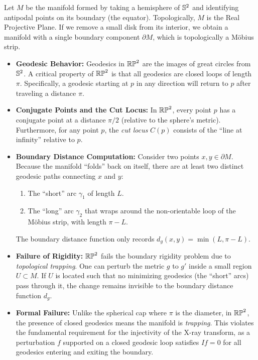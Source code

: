 \begin{example}
  Let $M$ be the manifold formed by taking a hemisphere of $\S^2$ and identifying antipodal points on its boundary (the equator). Topologically, $M$ is the Real Projective Plane. If we remove a small disk from its interior, we obtain a manifold with a single boundary component $\partial M$, which is topologically a M\"obius strip.

  \begin{itemize}
    \item \textbf{Geodesic Behavior:} Geodesics in $\RP^2$ are the images of great circles from $\S^2$. A critical property of $\RP^2$ is that all geodesics are closed loops of length $\pi$. Specifically, a geodesic starting at $p$ in any direction will return to $p$ after traveling a distance $\pi$.

    \item \textbf{Conjugate Points and the Cut Locus:} In $\RP^2$, every point $p$ has a conjugate point at a distance $\pi/2$ (relative to the sphere's metric). Furthermore, for any point $p$, the \emph{cut locus} $C(p)$ consists of the ``line at infinity'' relative to $p$. 

    \item \textbf{Boundary Distance Computation:} Consider two points $x, y \in \partial M$. Because the manifold ``folds'' back on itself, there are at least two distinct geodesic paths connecting $x$ and $y$:
      \begin{enumerate}
        \item The ``short'' arc $\gamma_1$ of length $L$.
        \item The ``long'' arc $\gamma_2$ that wraps around the non-orientable loop of the M\"obius strip, with length $\pi - L$.
      \end{enumerate}
      The boundary distance function only records $d_g(x, y) = \min(L, \pi - L)$.
  \end{itemize}

  \begin{itemize}
    \item \textbf{Failure of Rigidity:} $\RP^2$ fails the boundary rigidity problem due to \emph{topological trapping}. One can perturb the metric $g$ to $g'$ inside a small region $U \subset M$. If $U$ is located such that no minimizing geodesics (the ``short'' arcs) pass through it, the change remains invisible to the boundary distance function $d_g$.

    \item \textbf{Formal Failure:} Unlike the spherical cap where $\pi$ is the diameter, in $\RP^2$, the presence of closed geodesics means the manifold is \emph{trapping}. This violates the fundamental requirement for the injectivity of the X-ray transform, as a perturbation $f$ supported on a closed geodesic loop satisfies $If = 0$ for all geodesics entering and exiting the boundary.
  \end{itemize}
\end{example}

